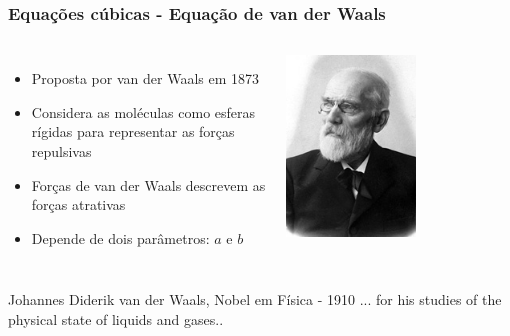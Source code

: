 \documentclass[aspectratio=169]{beamer}
\begin{document}
\begin{frame}
	\frametitle{Equações cúbicas - Equação de van der Waals}
	\begin{columns}[c] 
		\begin{itemize}
		\item Proposta por van der Waals em 1873
		\item Considera as moléculas como esferas \\
		rígidas para representar as forças\\
		repulsivas
		\item Forças de van der Waals descrevem as\\
		forças atrativas
		\item Depende de dois parâmetros: $a$ e $b$
		\end{itemize}
	\begin{center}
		\includegraphics[width=0.8\textwidth]{img/waals.jpg}
	\end{center}
	\end{columns}
	\begin{columns}
		\begin{footnotesize}
			\begin{exampleblock}{Johannes Diderik van der Waals, Nobel em Física - 1910}
				... for his studies of the physical state of liquids and gases..
			\end{exampleblock}
		\end{footnotesize}
	\end{columns}
\end{frame}
\end{document}
